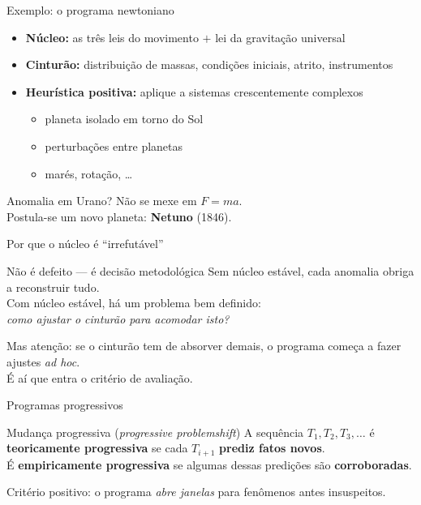 \documentclass[aspectratio=169]{beamer}
\newcommand{\impt}[1]{\textcolor{maccent}{\textbf{#1}}}
\newcommand{\ntc}[1]{\textcolor{mprimary}{#1}}
\begin{document}
\begin{frame}{Exemplo: o programa newtoniano}
\begin{itemize}
  \item \impt{Núcleo:} as três leis do movimento $+$ lei da gravitação universal
  \pause
  \item \impt{Cinturão:} distribuição de massas, condições iniciais, atrito, instrumentos
  \pause
  \item \impt{Heurística positiva:} aplique a sistemas crescentemente complexos
  \begin{itemize}
    \item planeta isolado em torno do Sol
    \item perturbações entre planetas
    \item marés, rotação, \ldots
  \end{itemize}
\end{itemize}
\vspace{0.4cm}
\pause
\ntc{Anomalia em Urano?} Não se mexe em $F=ma$. \\
Postula-se um novo planeta: \impt{Netuno} (1846).
\end{frame}

\begin{frame}{Por que o núcleo é ``irrefutável''}
\begin{alertblock}{Não é defeito --- é decisão metodológica}
Sem núcleo estável, cada anomalia obriga a reconstruir tudo. \\
Com núcleo estável, há um problema bem definido: \\
\emph{como ajustar o cinturão para acomodar isto?}
\end{alertblock}
\pause
\vspace{0.4cm}
\ntc{Mas atenção:} se o cinturão tem de absorver demais, o programa começa a fazer ajustes \emph{ad hoc}. \\[0.2cm]
É aí que entra o critério de avaliação.
\end{frame}

\begin{frame}{Programas progressivos}
\begin{block}{Mudança progressiva (\emph{progressive problemshift})}
A sequência $T_1, T_2, T_3, \ldots$ é \impt{teoricamente progressiva} se cada $T_{i+1}$ \impt{prediz fatos novos}. \\[0.15cm]
É \impt{empiricamente progressiva} se algumas dessas predições são \impt{corroboradas}.
\end{block}
\pause
\vspace{0.4cm}
\ntc{Critério positivo:} o programa \emph{abre janelas} para fenômenos antes insuspeitos.
\end{frame}
\end{document}
